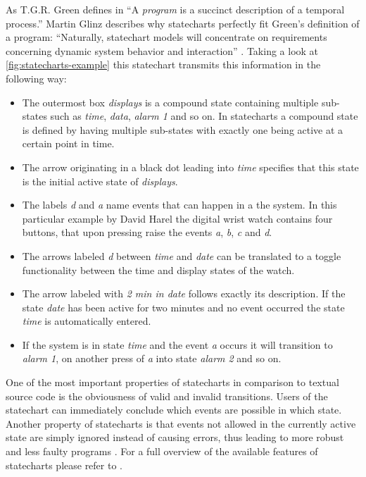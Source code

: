 As T.G.R. Green defines in \textcite[3]{green_pictures_1982} ``A \emph{program} is a succinct description of a temporal process.''
Martin Glinz describes why statecharts perfectly fit Green's definition of a program: ``Naturally, statechart models will concentrate on requirements concerning dynamic system behavior and interaction'' \autocite[1]{glinz_statecharts_2002}.
Taking a look at \cref{fig:statecharts-example} this statechart transmits this information in the following way:
\begin{itemize}
    \item The outermost box \emph{displays} is a compound state containing multiple sub-states such as \emph{time}, \emph{data}, \emph{alarm 1} and so on. In statecharts a compound state is defined by having multiple sub-states with exactly one being active at a certain point in time.
    \item The arrow originating in a black dot leading into \emph{time} specifies that this state is the initial active state of \emph{displays}.
    \item The labels \emph{d} and \emph{a} name events that can happen in a the system. In this particular example by David Harel the digital wrist watch contains four buttons, that upon pressing raise the events \emph{a}, \emph{b}, \emph{c} and \emph{d}.
    \item The arrows labeled \emph{d} between \emph{time} and \emph{date} can be translated to a toggle functionality between the time and display states of the watch.
    \item The arrow labeled with \emph{2 min in date} follows exactly its description. If the state \emph{date} has been active for two minutes and no event occurred the state \emph{time} is automatically entered.
    \item If the system is in state \emph{time} and the event \emph{a} occurs it will transition to \emph{alarm 1}, on another press of \emph{a} into state \emph{alarm 2} and so on.
\end{itemize}

One of the most important properties of statecharts in comparison to textual source code is the obviousness of valid and invalid transitions.
Users of the statechart can immediately conclude which events are possible in which state.
Another property of statecharts is that events not allowed in the currently active state are simply ignored instead of causing errors, thus leading to more robust and less faulty programs \autocite{horrocks_constructing_1999}.
For a full overview of the available features of statecharts please refer to \textcite{harel_statecharts:_1987}.

